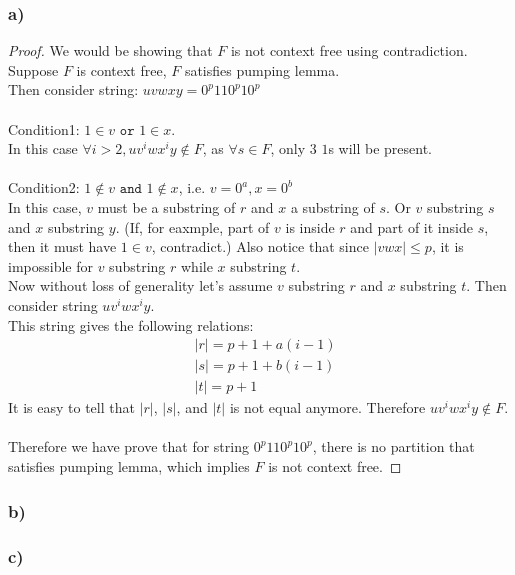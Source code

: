 \documentclass{article}
\begin{document}
\subsubsection{a)}
	\begin{proof}
		We would be showing that $F$ is not context free using contradiction. \\
		Suppose $F$ is context free, $F$ satisfies pumping lemma. \\
		Then consider string: $uvwxy = 0^{p}110^{p}10^{p}$ \\
		\\
		Condition1: $1 \in v \texttt{ or } 1 \in x$. \\
		In this case $\forall i > 2, uv^iwx^iy \notin F$, as $\forall s \in F$, only 3 $1$s will be present. \\
		\\
		Condition2: $1 \notin v \texttt{ and } 1 \notin x$, i.e. $v = 0^a, x = 0^b$ \\
		In this case, $v$ must be a substring of $r$ and $x$ a substring of $s$. Or $v$ substring $s$ and $x$ substring $y$. (If, for eaxmple, part of $v$ is inside $r$ and part of it inside $s$, then it must have $1 \in v$, contradict.) Also notice that since $|vwx| \le p$, it is impossible for $v$ substring $r$ while $x$ substring $t$.\\
		Now without loss of generality let's assume $v$ substring $r$ and $x$ substring $t$. Then consider string $uv^iwx^iy$. \\
		This string gives the following relations:
		\begin{equation*}\begin{aligned}
			& |r| = p+1+a(i-1) \\
			& |s| = p+1+b(i-1) \\
			& |t| = p+1
		\end{aligned}\end{equation*}
		It is easy to tell that $|r|$, $|s|$, and $|t|$ is not equal anymore.
		Therefore $uv^iwx^iy \notin F$. \\
		\\
		Therefore we have prove that for string $0^{p}110^{p}10^{p}$, there is no partition that satisfies pumping lemma, which implies $F$ is not context free.

	\end{proof}

\subsubsection{b)}
\subsubsection{c)}
\end{document}
